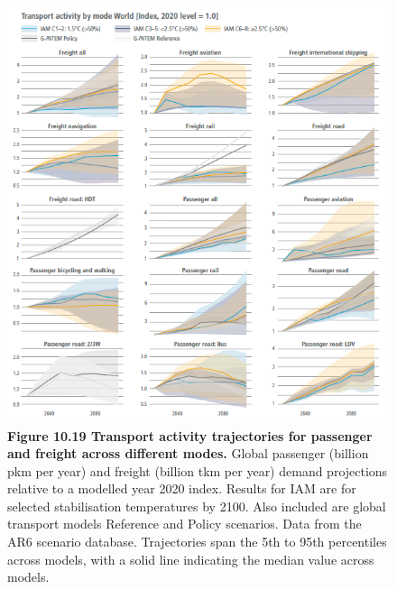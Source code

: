 \documentclass[
  letterpaper,
  DIV=11,
  numbers=noendperiod]{scrreprt}
\begin{document}
\begin{figure}

{\centering \includegraphics{./images/Fig-10.19.PNG}

}

\caption{\textbf{Figure 10.19 \textbar{} Transport activity trajectories
for passenger and freight across different modes.} Global passenger
(billion pkm per year) and freight (billion tkm per year) demand
projections relative to a modelled year 2020 index. Results for IAM are
for selected stabilisation temperatures by 2100. Also included are
global transport models Reference and Policy scenarios. Data from the
AR6 scenario database. Trajectories span the 5th to 95th percentiles
across models, with a solid line indicating the median value across
models.}

\end{figure}
\end{document}
